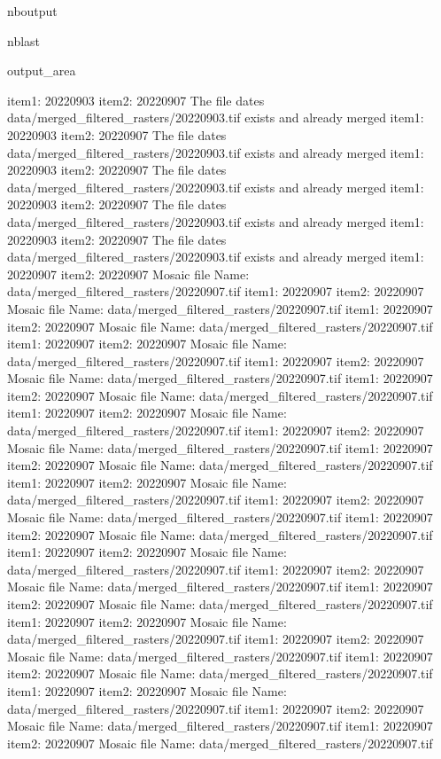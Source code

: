 \documentclass[letterpaper,10pt]{sphinxmanual}
\begin{document}
\begin{sphinxuseclass}{nboutput}
\begin{sphinxuseclass}{nblast}
{\begin{sphinxuseclass}{output_area}
\begin{sphinxuseclass}{}
\begin{sphinxVerbatim}[commandchars=\\\{\}]
item1:  20220903
item2:  20220907
The file dates data/merged\_filtered\_rasters/20220903.tif exists and already merged
item1:  20220903
item2:  20220907
The file dates data/merged\_filtered\_rasters/20220903.tif exists and already merged
item1:  20220903
item2:  20220907
The file dates data/merged\_filtered\_rasters/20220903.tif exists and already merged
item1:  20220903
item2:  20220907
The file dates data/merged\_filtered\_rasters/20220903.tif exists and already merged
item1:  20220903
item2:  20220907
The file dates data/merged\_filtered\_rasters/20220903.tif exists and already merged
item1:  20220907
item2:  20220907
Mosaic file Name:  data/merged\_filtered\_rasters/20220907.tif
item1:  20220907
item2:  20220907
Mosaic file Name:  data/merged\_filtered\_rasters/20220907.tif
item1:  20220907
item2:  20220907
Mosaic file Name:  data/merged\_filtered\_rasters/20220907.tif
item1:  20220907
item2:  20220907
Mosaic file Name:  data/merged\_filtered\_rasters/20220907.tif
item1:  20220907
item2:  20220907
Mosaic file Name:  data/merged\_filtered\_rasters/20220907.tif
item1:  20220907
item2:  20220907
Mosaic file Name:  data/merged\_filtered\_rasters/20220907.tif
item1:  20220907
item2:  20220907
Mosaic file Name:  data/merged\_filtered\_rasters/20220907.tif
item1:  20220907
item2:  20220907
Mosaic file Name:  data/merged\_filtered\_rasters/20220907.tif
item1:  20220907
item2:  20220907
Mosaic file Name:  data/merged\_filtered\_rasters/20220907.tif
item1:  20220907
item2:  20220907
Mosaic file Name:  data/merged\_filtered\_rasters/20220907.tif
item1:  20220907
item2:  20220907
Mosaic file Name:  data/merged\_filtered\_rasters/20220907.tif
item1:  20220907
item2:  20220907
Mosaic file Name:  data/merged\_filtered\_rasters/20220907.tif
item1:  20220907
item2:  20220907
Mosaic file Name:  data/merged\_filtered\_rasters/20220907.tif
item1:  20220907
item2:  20220907
Mosaic file Name:  data/merged\_filtered\_rasters/20220907.tif
item1:  20220907
item2:  20220907
Mosaic file Name:  data/merged\_filtered\_rasters/20220907.tif
item1:  20220907
item2:  20220907
Mosaic file Name:  data/merged\_filtered\_rasters/20220907.tif
item1:  20220907
item2:  20220907
Mosaic file Name:  data/merged\_filtered\_rasters/20220907.tif
item1:  20220907
item2:  20220907
Mosaic file Name:  data/merged\_filtered\_rasters/20220907.tif
item1:  20220907
item2:  20220907
Mosaic file Name:  data/merged\_filtered\_rasters/20220907.tif
item1:  20220907
item2:  20220907
Mosaic file Name:  data/merged\_filtered\_rasters/20220907.tif
item1:  20220907
item2:  20220907
Mosaic file Name:  data/merged\_filtered\_rasters/20220907.tif

\end{sphinxVerbatim}
\end{sphinxuseclass}
\end{sphinxuseclass}}
\end{sphinxuseclass}
\end{sphinxuseclass}
\end{document}
